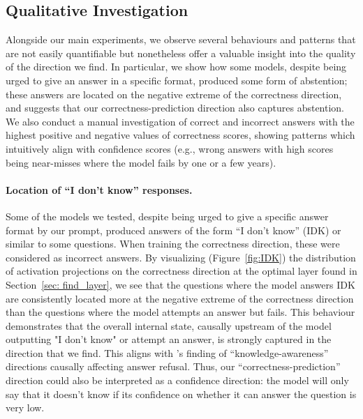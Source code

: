 \documentclass{article} %
\begin{document}
\subsection{Qualitative Investigation}
Alongside our main experiments, we observe several behaviours and patterns that are not easily quantifiable but nonetheless offer a valuable insight into the quality of the direction we find. In particular, we show how some models, despite being urged to give an answer in a specific format, produced some form of abstention; these answers are located on the negative extreme of the correctness direction, and suggests that our correctness-prediction direction also captures abstention. We also conduct a manual investigation of correct and incorrect answers with the highest positive and negative values of correctness scores, showing patterns which intuitively align with confidence scores (e.g., wrong answers with high scores being near-misses where the model fails by one or a few years).


\paragraph{Location of ``I don't know'' responses.}\label{sec:IDK}

Some of the models we tested, despite being urged to give a specific answer format by our prompt, produced answers of the form ``I don't know'' (IDK) or similar to some questions.  When training the correctness direction, these were considered as incorrect answers. By visualizing (Figure~\ref{fig:IDK}) the distribution of activation projections on the correctness direction at the optimal layer found in Section~\ref{sec: find_layer}, we see that the questions where the model answers IDK are consistently located more at the negative extreme of the correctness direction than the questions where the model attempts an answer but fails.
This behaviour demonstrates that the overall internal state, causally upstream of the model outputting "I don't know" or attempt an answer, is strongly captured in the direction that we find. This aligns with \citet{ferrando2025do}'s finding of ``knowledge-awareness'' directions causally affecting answer refusal.
Thus, our ``correctness-prediction'' direction could also be interpreted as a confidence direction: the model will only say that it doesn't know if its confidence on whether it can answer the question is very low. 
\end{document}
